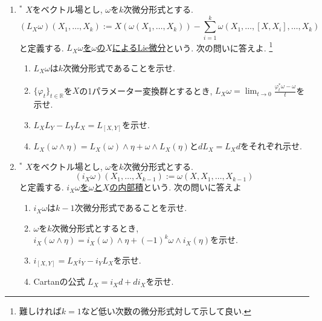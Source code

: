 \documentclass[dvipdfmx,a4paper,11pt]{article}
\newcommand{\R}{\mathbb{R}}
\theoremstyle{definition}
\begin{document}
\begin{enumerate}[label=\textbf{問}3.\arabic*]

\vspace{11pt}



\item $^{*}$ $X$をベクトル場とし, $\omega$を$k$次微分形式とする.
$$
(L_{X}\omega) (X_1,\ldots, X_k):=X(\omega(X_1, \ldots, X_k)) - \sum_{i=1}^{k}\omega(X_1, \ldots, [X,X_i], \ldots, X_k)
$$
と定義する. \underline{$L_{X}\omega$を$\omega$の$X$によるLie微分}という. 次の問いに答えよ. \footnote{難しければ$k=1$など低い次数の微分形式対して示して良い. }
\begin{enumerate}
 \setlength{\parskip}{0cm}
  \setlength{\itemsep}{2pt} 
\item $L_X \omega$は$k$次微分形式であることを示せ. 
\item $\{ \varphi_{t} \}_{t \in \R}$を$X$の1パラメーター変換群とするとき, $L_{X} \omega = \lim_{t \rightarrow 0}\frac{\varphi^{*}_{t} \omega - \omega}{t}$を示せ. 
\item $L_{X}L_{Y} - L_{Y}L_{X}= L_{[X,Y]}$を示せ.
\item $L_{X}(\omega \wedge \eta )=L_{X}(\omega) \wedge \eta  + \omega \wedge L_{X}( \eta )$と$d L_{X} = L_{X}  d$をそれぞれ示せ.
\end{enumerate}

\item $^{*}$ $X$をベクトル場とし, $\omega$を$k$次微分形式とする.
$$
(i_{X}\omega) (X_1,\ldots, X_{k-1}):=\omega(X, X_1, \ldots, X_{k-1}) 
$$
と定義する. \underline{$i_{X}\omega$を$\omega$と$X$の内部積}という. 次の問いに答えよ
\begin{enumerate}
 \setlength{\parskip}{0cm}
  \setlength{\itemsep}{2pt} 
\item $i_X \omega$は$k-1$次微分形式であることを示せ. 
\item $\omega$を$k$次微分形式とするとき, $i_{X}(\omega \wedge \eta )=i_{X}(\omega) \wedge \eta  +(-1)^k \omega \wedge i_{X}( \eta )$を示せ. 
\item $i_{[X,Y]} = L_{X} i_{Y} - i_{Y} L_X$を示せ.
\item Cartanの公式 $L_X = i_{X}  d + d  i_{X} $を示せ. 
\end{enumerate}


\end{enumerate}
\end{document}
